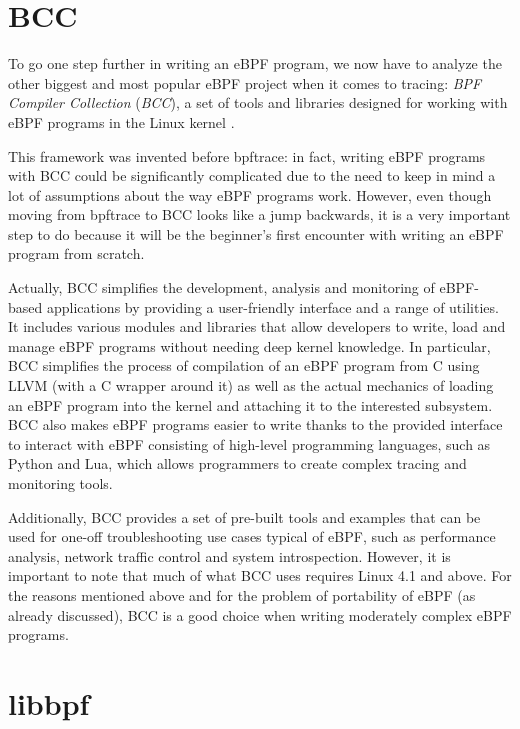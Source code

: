 \section{BCC}

To go one step further in writing an eBPF program, we now have to analyze the other biggest and most popular eBPF project when it comes to tracing: \textit{BPF Compiler Collection} (\textit{BCC}), a set of tools and libraries designed for working with eBPF programs in the Linux kernel \cite{BCCRepo}.

This framework was invented before bpftrace: in fact, writing eBPF programs with BCC could be significantly complicated due to the need to keep in mind a lot of assumptions about the way eBPF programs work.
However, even though moving from bpftrace to BCC looks like a jump backwards, it is a very important step to do because it will be the beginner's first encounter with writing an eBPF program from scratch.
 
Actually, BCC simplifies the development, analysis and monitoring of eBPF-based applications by providing a user-friendly interface and a range of utilities. 
It includes various modules and libraries that allow developers to write, load and manage eBPF programs without needing deep kernel knowledge. 
In particular, BCC simplifies the process of compilation of an eBPF program from C using LLVM (with a C wrapper around it) as well as the actual mechanics of loading an eBPF program into the kernel and attaching it to the interested subsystem.
BCC also makes eBPF programs easier to write thanks to the provided interface to interact with eBPF consisting of high-level programming languages, such as Python and Lua, which allows programmers to create complex tracing and monitoring tools.

Additionally, BCC provides a set of pre-built tools and examples that can be used for one-off troubleshooting use cases typical of eBPF, such as performance analysis, network traffic control and system introspection.
However, it is important to note that much of what BCC uses requires Linux 4.1 and above.
For the reasons mentioned above and for the problem of portability of eBPF (as already discussed), BCC is a good choice when writing moderately complex eBPF programs.

\section{libbpf}

